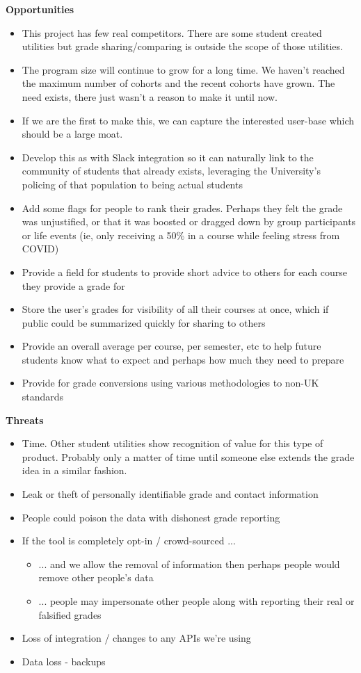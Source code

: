 \textbf{Opportunities}
\begin{itemize}
    \item This project has few real competitors. There are some student created utilities but grade sharing/comparing is outside the scope of those utilities.
    \item The program size will continue to grow for a long time. We haven't reached the maximum number of cohorts and the recent cohorts have grown. The need exists, there just wasn't a reason to make it until now.
    \item If we are the first to make this, we can capture the interested user-base which should be a large moat.
    \item Develop this as with Slack integration so it can naturally link to the community of students that already exists, leveraging the University's policing of that population to being actual students
    \item Add some flags for people to rank their grades. Perhaps they felt the grade was unjustified, or that it was boosted or dragged down by group participants or life events (ie, only receiving a 50\% in a course while feeling stress from COVID)
    \item Provide a field for students to provide short advice to others for each course they provide a grade for
    \item Store the user's grades for visibility of all their courses at once, which if public could be summarized quickly for sharing to others
    \item Provide an overall average per course, per semester, etc to help future students know what to expect and perhaps how much they need to prepare
    \item Provide for grade conversions using various methodologies to non-UK standards
\end{itemize}
\textbf{Threats}
\begin{itemize}
    \item Time. Other student utilities show recognition of value for this type of product. Probably only a matter of time until someone else extends the grade idea in a similar fashion.
    \item Leak or theft of personally identifiable grade and contact information
    \item People could poison the data with dishonest grade reporting
    \item If the tool is completely opt-in / crowd-sourced ...
    \begin{itemize}
        \item ... and we allow the removal of information then perhaps people would remove other people's data
    \end{itemize}
    \begin{itemize}
        \item ... people may impersonate other people along with reporting their real or falsified grades
    \end{itemize}
    \item Loss of integration / changes to any APIs we're using
    \item Data loss - backups
\end{itemize}
